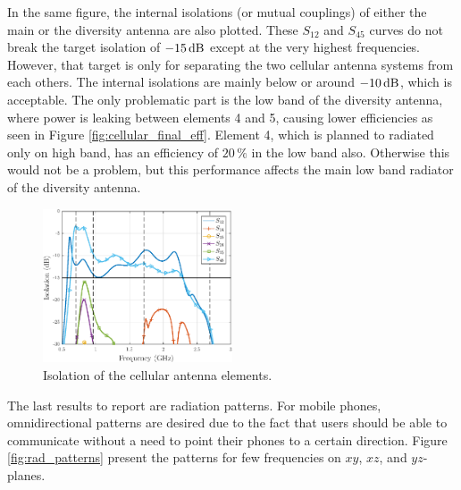 In the same figure, the internal isolations (or mutual couplings) of either the main or the diversity antenna are also plotted. These $S_{12}$ and $S_{45}$ curves do not break the target isolation of $-15\,\mathrm{dB}$ except at the very highest frequencies. However, that target is only for separating the two cellular antenna systems from each others. The internal isolations are mainly below or around $-10\,\mathrm{dB}$, which is acceptable. The only problematic part is the low band of the diversity antenna, where power is leaking between elements 4 and 5, causing lower efficiencies as seen in Figure \ref{fig:cellular_final_eff}. Element 4, which is planned to radiated only on high band, has an efficiency of $20\,\%$ in the low band also. Otherwise this would not be a problem, but this performance affects the main low band radiator of the diversity antenna.
\begin{figure}[H]
    \centering
    \includegraphics[width=0.5\textwidth]{img/isolation_match_wgps.eps}
    \caption{Isolation of the cellular antenna elements.}
    \label{fig:isolation}
\end{figure}

The last results to report are radiation patterns. For mobile phones, omnidirectional patterns are desired due to the fact that users should be able to communicate without a need to point their phones to a certain direction. Figure \ref{fig:rad_patterns} present the patterns for few frequencies on $xy$, $xz$, and $yz$-planes.


